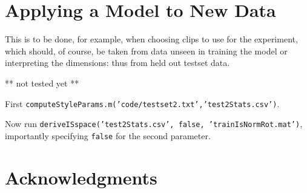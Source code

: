 \documentclass[11pt]{article}
\begin{document}
\section{Applying a Model to New Data}

This is to be done, for example, when choosing clips to use for the
experiment, which should, of course, be taken from data unseen in
training the model or interpreting the dimensions: thus from held out
testset data.

** not tested yet **

First {\tt computeStyleParams.m('code/testset2.txt','test2Stats.csv')}.

Now run {\tt deriveISspace('test2Stats.csv', false,
  'trainIsNormRot.mat')}, importantly specifying {\tt false} for the
second parameter.


\section{Acknowledgments }  



%

\end{document}
